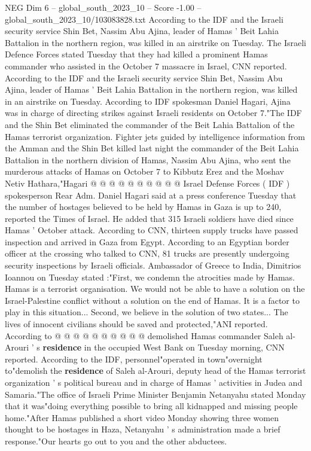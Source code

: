 \begin{textsample}{NEG Dim 6 – global\_south\_2023\_10 – Score -1.00 – global\_south\_2023\_10/103083828.txt}  \label{ex:f6_neg_212}
According to the IDF and the Israeli security service Shin Bet, Nassim Abu Ajina, leader of Hamas ' Beit Lahia Battalion in the northern region, was killed in an airstrike on Tuesday.
The Israeli Defence Forces stated Tuesday that they had killed a prominent Hamas commander who assisted in the October 7 massacre in Israel, CNN reported.
According to the IDF and the Israeli security service Shin Bet, Nassim Abu Ajina, leader of Hamas ' Beit Lahia Battalion in the northern region, was killed in an airstrike on Tuesday.
According to IDF spokesman Daniel Hagari, Ajina was in charge of directing strikes against Israeli residents on October 7."The IDF and the Shin Bet eliminated the commander of the Beit Lahia Battalion of the Hamas terrorist organization.
Fighter jets guided by intelligence information from the Amman and the Shin Bet killed last night the commander of the Beit Lahia Battalion in the northern division of Hamas, Nassim Abu Ajina, who sent the murderous attacks of Hamas on October 7 to Kibbutz Erez and the Moshav Netiv Hathara,"Hagari @ @ @ @ @ @ @ @ @ @ Israel Defense Forces ( IDF ) spokesperson Rear Adm.
Daniel Hagari said at a press conference Tuesday that the number of hostages believed to be held by Hamas in Gaza is up to 240, reported the Times of Israel.
He added that 315 Israeli soldiers have died since Hamas ' October attack.
According to CNN, thirteen supply trucks have passed inspection and arrived in Gaza from Egypt.
According to an Egyptian border officer at the crossing who talked to CNN, 81 trucks are presently undergoing security inspections by Israeli officials.
Ambassador of Greece to India, Dimitrios Ioannou on Tuesday stated :"First, we condemn the atrocities made by Hamas.
Hamas is a terrorist organisation.
We would not be able to have a solution on the Israel-Palestine conflict without a solution on the end of Hamas.
It is a factor to play in this situation...
Second, we believe in the solution of two states...
The lives of innocent civilians should be saved and protected,"ANI reported.
According to @ @ @ @ @ @ @ @ @ @ demolished Hamas commander Saleh al-Arouri ' s \textbf{residence} in the occupied West Bank on Tuesday morning, CNN reported.
According to the IDF, personnel"operated in town"overnight to"demolish the \textbf{residence} of Saleh al-Arouri, deputy head of the Hamas terrorist organization ' s political bureau and in charge of Hamas ' activities in Judea and Samaria."The office of Israeli Prime Minister Benjamin Netanyahu stated Monday that it was"doing everything possible to bring all kidnapped and missing people home."After Hamas published a short video Monday showing three women thought to be hostages in Haza, Netanyahu ' s administration made a brief response."Our hearts go out to you and the other abductees.

\end{textsample}
